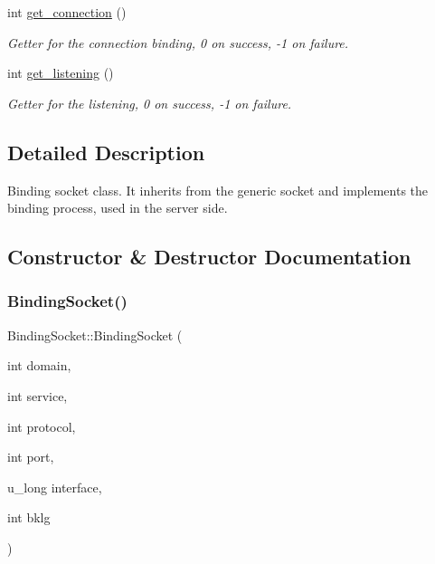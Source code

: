 \begin{DoxyCompactItemize}
\mbox{\label{classBindingSocket_acaf64a54e51eea07f5f7268b805ab3d0}} 
int \hyperlink{classBindingSocket_acaf64a54e51eea07f5f7268b805ab3d0}{get\+\_\+connection} ()
\begin{DoxyCompactList}\small\item\em Getter for the connection binding, 0 on success, -\/1 on failure. \end{DoxyCompactList}\item 
\mbox{\label{classBindingSocket_a562609b198ba3db277549ae4d465d1c2}} 
int \hyperlink{classBindingSocket_a562609b198ba3db277549ae4d465d1c2}{get\+\_\+listening} ()
\begin{DoxyCompactList}\small\item\em Getter for the listening, 0 on success, -\/1 on failure. \end{DoxyCompactList}\end{DoxyCompactItemize}


\subsection{Detailed Description}
Binding socket class. It inherits from the generic socket and implements the binding process, used in the server side. 

\subsection{Constructor \& Destructor Documentation}
\mbox{\label{classBindingSocket_aee27b67c01411fa363865e92310b015c}} 
\subsubsection{\texorpdfstring{Binding\+Socket()}{BindingSocket()}}
{\footnotesize\ttfamily Binding\+Socket\+::\+Binding\+Socket (\begin{DoxyParamCaption}\item[{int}]{domain,  }\item[{int}]{service,  }\item[{int}]{protocol,  }\item[{int}]{port,  }\item[{u\+\_\+long}]{interface,  }\item[{int}]{bklg }\end{DoxyParamCaption})}



